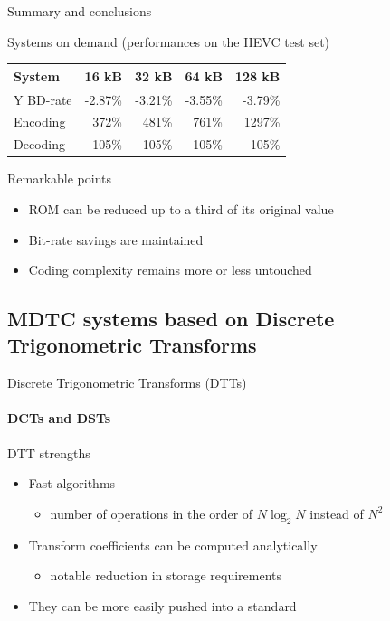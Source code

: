 \documentclass[10pt]{beamer} %
\begin{document}
\begin{frame}{Summary and conclusions}
	\begin{block}{Systems on demand (performances on the HEVC test set)}
		\vspace{1em}
		\centering
		\begin{tabular}{l|r|r|r|r}
			System
			& \multicolumn{1}{c|}{16 kB}
			& \multicolumn{1}{c|}{32 kB}
			& \multicolumn{1}{c|}{64 kB}
			& \multicolumn{1}{c}{128 kB} \\
			\hline\hline
			Y BD-rate & -2.87\%  & -3.21\%  & -3.55\%  & -3.79\%\\
			Encoding  & 372\%    & 481\%    & 761\%    & 1297\%\\
			Decoding  & 105\%    & 105\%    & 105\%    & 105\%\\
		\end{tabular}
	\end{block}
	\begin{block}{Remarkable points}
		\begin{itemize}
			\item ROM can be reduced up to a third of its original value
			\item Bit-rate savings are maintained
			\item Coding complexity remains more or less untouched
		\end{itemize}
	\end{block}
\end{frame}

\subsection{MDTC systems based on Discrete Trigonometric Transforms}

\begin{frame}{Discrete Trigonometric Transforms (DTTs)}
\framesubtitle{DCTs and DSTs}
\begin{block}{DTT strengths}
	\begin{itemize}
		\item Fast algorithms
			\begin{itemize}
				\item number of operations in the order of $N\log_2 N$ instead
					of $N^2$
			\end{itemize}
		\item Transform coefficients can be computed analytically
			\begin{itemize}
				\item notable reduction in storage requirements
			\end{itemize}
		\item They can be more easily pushed into a standard
	\end{itemize}
\end{block}
\end{frame}
\end{document}
